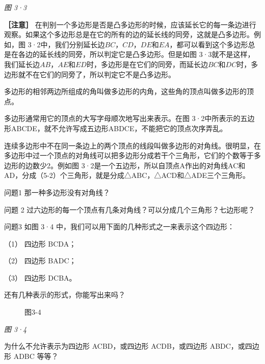 \emph{图 3·3}

\textbf{［注意］}
在判别一个多边形是否是凸多边形的时候，应该延长它的每一条边进行观察。如果这个多边形总是在它的所有的边的延长线的同旁，这就是凸多边形。例如，图
3·2中，我们分别延长边\(BC\)，\(CD\)，\(DE\)和\(EA\)，都可以看到这个多边形总是在各边的延长线的同旁，所以判定它是凸多边形。但是如图
3·3就不是这样，我们延长边\(AB\)，\(AE\)和\(ED\)时，多边形是在它们的同旁，而延长边\(BC\)和\(DC\)时，多边形就不在它们的同旁了，所以判定它不是凸多边形。

多边形的相邻两边所组成的角叫做多边形的内角，这些角的顶点叫做多边形的顶点。

多边形通常用它的顶点的大写字母顺次地写出来表示。在图
3·2中所表示的五边形ABCDE，就不允许写成五边形ABDCE，不能把它的顶点次序弄乱。

连续多边形中不在同一条边上的两个顶点的线段叫做多边形的对角线。很明显，在多边形中过一个顶点的对角线可以把多边形分成若干个三角形，它们的个数等于多边形的边数少2。例如图
3·2是一个五边形，所以自顶点A作出的对角线AC和AD，分成（5-2）个三角形，就是分成△ABC，△ACD和△ADE三个三角形。

问题1 那一种多边形没有对角线？

问题 2 过六边形的每一个顶点有几条对角线？可以分成几个三角形？七边形呢？

问题3 如图 3·4 中，我们可以用下面的几种形式之一来表示这个四边形：

（1） 四边形 BCDA；

（2） 四边形 BADC；

（3） 四边形 DCBA。

还有几种表示的形式，你能写出来吗？

\begin{figure}
\centering
{}
\caption{图3-4}
\end{figure}

\emph{图 3·4}

为什么不允许表示为四边形 ACBD，或四边形 ACDB，或四边形 ABDC，或四边形
ADBC 等等？

